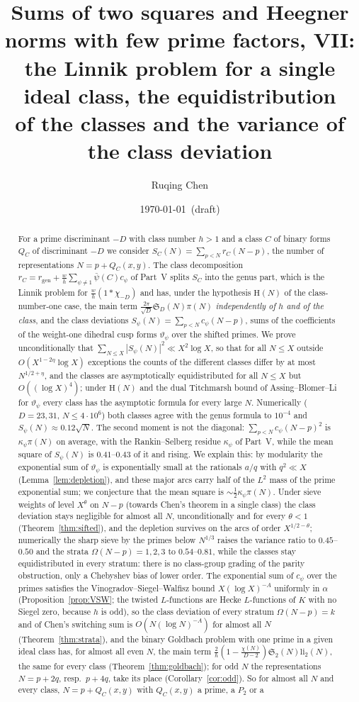 \documentclass[11pt]{amsart}
\title[Sums of two squares and Heegner norms, VII]{Sums of two squares and Heegner norms with few prime factors, VII:\\ the Linnik problem for a single ideal class, the equidistribution\\ of the classes and the variance of the class deviation}
\author{Ruqing Chen}
\date{\today\ (draft)}
\theoremstyle{remark}
\newcommand{\sS}{\mathfrak S}
\newcommand{\vt}{\vartheta}
\newcommand{\gen}{\mathrm{gen}}
\begin{document}
\begin{abstract}
For a prime discriminant $-D$ with class number $h>1$ and a class $C$ of binary forms $Q_C$ of discriminant $-D$ we consider $S_C(N)=\sum_{p<N}r_C(N-p)$, the number of representations $N=p+Q_C(x,y)$. The class decomposition $r_C=r_\gen+\frac wh\sum_{\psi\ne1}\bar\psi(C)c_\psi$ of Part~V splits $S_C$ into the genus part, which is the Linnik problem for $\frac wh(1*\chi_{-D})$ and has, under the hypothesis $\mathrm H(N)$ of the class-number-one case, the main term $\frac{2\pi}{\sqrt D}\sS_D(N)\pi(N)$ \emph{independently of $h$ and of the class}, and the class deviations $S_\psi(N)=\sum_{p<N}c_\psi(N-p)$, sums of the coefficients of the weight-one dihedral cusp forms $\vt_\psi$ over the shifted primes. We prove unconditionally that $\sum_{N\le X}|S_\psi(N)|^2\ll X^2\log X$, so that for all $N\le X$ outside $O(X^{1-2\eta}\log X)$ exceptions the counts of the different classes differ by at most $N^{1/2+\eta}$, and the classes are asymptotically equidistributed for all $N\le X$ but $O((\log X)^4)$; under $\mathrm H(N)$ and the dual Titchmarsh bound of Assing--Blomer--Li for $\vt_\psi$ every class has the asymptotic formula for every large $N$. Numerically ($D=23,31$, $N\le4\cdot10^6$) both classes agree with the genus formula to $10^{-4}$ and $S_\psi(N)\approx0.12\sqrt N$. The second moment is not the diagonal: $\sum_{p<N}c_\psi(N-p)^2$ is $\kappa_\psi\pi(N)$ on average, with the Rankin--Selberg residue $\kappa_\psi$ of Part~V, while the mean square of $S_\psi(N)$ is $0.41$--$0.43$ of it and rising. We explain this: by modularity the exponential sum of $\vt_\psi$ is exponentially small at the rationals $a/q$ with $q^2\ll X$ (Lemma~\ref{lem:depletion}), and these major arcs carry half of the $L^2$ mass of the prime exponential sum; we conjecture that the mean square is $\sim\frac12\kappa_\psi\pi(N)$. Under sieve weights of level $X^\theta$ on $N-p$ (towards Chen's theorem in a single class) the class deviation stays negligible for almost all $N$, unconditionally and for every $\theta<1$ (Theorem~\ref{thm:sifted}), and the depletion survives on the arcs of order $X^{1/2-\theta}$; numerically the sharp sieve by the primes below $N^{1/3}$ raises the variance ratio to $0.45$--$0.50$ and the strata $\Omega(N-p)=1,2,3$ to $0.54$--$0.81$, while the classes stay equidistributed in every stratum: there is no class-group grading of the parity obstruction, only a Chebyshev bias of lower order. The exponential sum of $c_\psi$ over the primes satisfies the Vinogradov--Siegel--Walfisz bound $X(\log X)^{-A}$ uniformly in $\alpha$ (Proposition~\ref{prop:VSW}; the twisted $L$-functions are Hecke $L$-functions of $K$ with no Siegel zero, because $h$ is odd), so the class deviation of every stratum $\Omega(N-p)=k$ and of Chen's switching sum is $O(N(\log N)^{-A})$ for almost all $N$ (Theorem~\ref{thm:strata}), and the binary Goldbach problem with one prime in a given ideal class has, for almost all even $N$, the main term $\frac2h(1-\frac{\chi(N)}{D-2})\sS_2(N)\mathrm{li}_2(N)$, the same for every class (Theorem~\ref{thm:goldbach}); for odd $N$ the representations $N=p+2q$, resp.\ $p+4q$, take its place (Corollary~\ref{cor:odd}). So for almost all $N$ and every class, $N=p+Q_C(x,y)$ with $Q_C(x,y)$ a prime, a $P_2$ or a 
\end{abstract}
\end{document}
